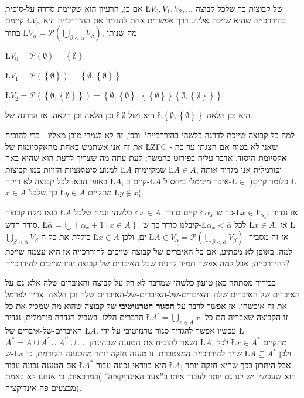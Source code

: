 \documentclass[english,hebrew]{article}
\begin{document}
אם כן, הרעיון הוא שקיימת סדרה על-סופית \L{$V_{0},V_{1},V_{2},\ldots$}
של קבוצות כך שלכל קבוצה קיימת \L{$V_{\alpha}$} בהיררכייה שהיא שייכת
אליה. דרך אפשרית אחת להגדיר את ההיררכייה היא בתור \L{$V_{\alpha}=\mathcal{P}\left(\bigcup_{\beta<\alpha}V_{\beta}\right)$},
מה שנותן

\L{$V_{0}=\mathcal{P}\left(\emptyset\right)=\left\{ \emptyset\right\} $}

\L{$V_{1}=\mathcal{P}\left(\left\{ \emptyset\right\} \right)=\left\{ \emptyset,\left\{ \emptyset\right\} \right\} $}

\L{$V_{2}=\mathcal{P}\left(\left\{ \emptyset,\left\{ \emptyset\right\} \right\} \right)=\left\{ \emptyset,\left\{ \emptyset\right\} ,\left\{ \left\{ \emptyset\right\} \right\} \left\{ \emptyset,\left\{ \emptyset\right\} \right\} \right\} $}

וכן הלאה וכן הלאה. אז הדרגה של \L{$\emptyset$} היא {\endL}
ושל \L{$\left\{ \emptyset,\left\{ \emptyset\right\} \right\} $} היא
{\endL} וכן הלאה.

למה כל קבוצה שייכת לדרגה כלשהי בהיררכייה? ובכן, זה לא לגמרי מובן מאליו
- כדי להוכיח את זה אני אשתמש באחת מהאקסיומות של \L{ZFC} שאני לא בטוח
אם הצגתי עד כה - \textbf{אקסיומת היסוד}. אדבר עליה בפירוט בהמשך; לעת
עתה מה שצריך לדעת הוא שהיא באה למנוע סיטואציות הזויות כמו קבוצות \L{$A$}
שמקיימות \L{$A\in A$}, ופורמלית אני מגדיר אותה באופן הבא: לכל קבוצה
לא ריקה \L{$A$}, קיים ב-\L{$A$} איבר מינימלי ביחס ל-\L{$\in$} )כלומר
קיים \L{$x\in A$} כך שלכל \L{$y\in A$} מתקיים \L{$y\notin x$}(.

בואו ניקח קבוצה \L{$A$} כלשהי ונניח שלכל \L{$x\in A$}, קיים סודר
\L{$\alpha_{x}$} כך ש-\L{$x\in V_{\alpha_{x}}$}. אז נגדיר סודר חדש,
\L{$\overline{\alpha}=\bigcup\left\{ \alpha_{x}+1\ |\ x\in A\right\} $}.
קיבלנו סודר כך ש-\L{$\alpha_{x}<\overline{\alpha}$} לכל \L{$x\in A$},
אז \L{$\bigcup_{\beta<\overline{\alpha}}V_{\beta}$} כוללת את כל ה-\L{$x\in A$}-ים,
ולכן \L{$A\in V_{\overline{\alpha}}=\mathcal{P}\left(\bigcup_{\beta<\overline{\alpha}}V_{\beta}\right)$}.
אז זה מסביר למה, באופן לא מפתיע, אם כל האיברים של קבוצה שייכים להיררכייה
אז היא עצמה שייכת להיררכייה; אבל למה אפשר תמיד להניח שכל האיברים של
קבוצה יהיו שייכים להיררכייה?

בבירור מסתתר כאן טיעון כלשהו שמדבר לא רק על קבוצה והאיברים שלה אלא
גם על האיברים של האיברים שלה והאיברים-של-האיברים-של-האיברים שלה וכן
הלאה. צריך לפרמל את זה איכשהו, אז אפשר לדבר על \textbf{הסגור הטרנזיטיבי}
של קבוצה שהוא מה שמכיל את כל הדברים הללו. בשביל הגדרה פורמלית, נגדיר
\L{$A^{\prime}=\bigcup_{x\in A}x$}: זו הקבוצה שאבריה הם כל האיברים-של-איברים
של \L{$A$}. עכשיו אפשר להגדיר סגור טרנזיטיבי על ידי \L{$A^{*}=A\cup A^{\prime}\cup A^{\prime\prime}\cup\ldots$}.
נשאר להוכיח את הטענה שבהינתן \L{$A$}, לכל \L{$x\in A^{*}$} מתקיים
ש-\L{$x$} שייך להיררכייה המצטברת. זו טענה חזקה יותר מהטענה הקודמת,
כי \L{$A\subseteq A^{*}$} ולכן אם הטענה נכונה עבור \L{$A^{*}$} היא
בוודאי נכונה עבור \L{$A$}; אבל היתרון בכך שהיא חזקה יותר הוא שעכשיו
יש לנו גם יותר לעבוד איתו ב\textquotedblright צעד האינדוקציה\textquotedblright{}
)במרכאות, כי אנחנו לא באמת מבצעים פה אינדוקציה(.
\end{document}
